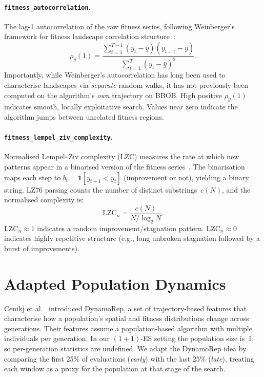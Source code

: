 \paragraph{\texttt{fitness\_autocorrelation}.}
The lag-1 autocorrelation of the raw fitness series, following Weinberger's
framework for fitness landscape correlation structure~\cite{weinberger1990fitness}:
\begin{equation}
\label{eq:fitac}
  \rho_y(1)
    = \frac{\sum_{t=1}^{T-1}(y_t - \bar{y})(y_{t+1} - \bar{y})}
           {\sum_{t=1}^{T}(y_t - \bar{y})^2}.
\end{equation}
Importantly, while Weinberger's autocorrelation has long been used to
characterise landscapes via \emph{separate} random walks, it has not previously
been computed on the algorithm's \emph{own} trajectory on BBOB.  High positive
$\rho_y(1)$ indicates smooth, locally exploitative search. Values near zero
indicate the algorithm jumps between unrelated fitness regions.

\paragraph{\texttt{fitness\_lempel\_ziv\_complexity}.}
Normalised Lempel--Ziv complexity (LZC) measures the rate at which new
patterns appear in a binarised version of the fitness
series~\cite{lempel1976complexity}.  The binarisation maps each step to
$b_t = \mathbf{1}[y_{t+1} < y_t]$ (improvement or not), yielding a binary
string.  LZ76 parsing counts the number of distinct substrings~$c(N)$, and the
normalised complexity is:
\begin{equation}
\label{eq:lzc}
  \mathrm{LZC}_n = \frac{c(N)}{N / \log_2 N}.
\end{equation}
$\mathrm{LZC}_n \approx 1$ indicates a random improvement/stagnation pattern.
$\mathrm{LZC}_n \approx 0$ indicates highly repetitive structure (e.g.,
long unbroken stagnation followed by a burst of improvements).

\section{Adapted Population Dynamics}
\label{sec:features:dynamo}

Cenikj et al.~\cite{cenikj2023dynamorep} introduced DynamoRep, a set of
trajectory-based features that characterise how a population's spatial and
fitness distributions change across generations.  Their features assume a
population-based algorithm with multiple individuals per generation.  In our
$(1{+}1)$-ES setting the population size is~1, so per-generation statistics
are undefined.  We adapt the DynamoRep idea by comparing the first 25\% of
evaluations (\emph{early}) with the last 25\% (\emph{late}), treating each
window as a proxy for the population at that stage of the search.

